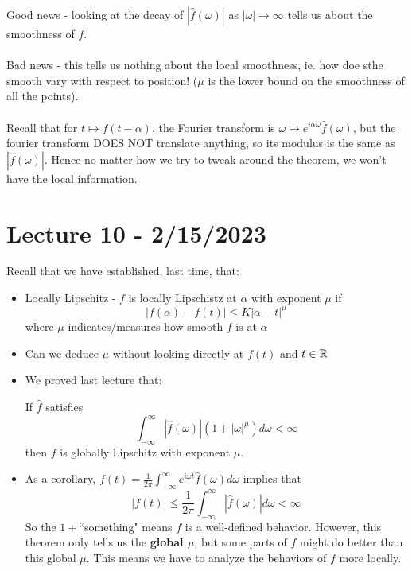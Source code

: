 \documentclass{article}
\begin{document}
Good news - looking at the decay of $|\widehat{f}(\omega)|$ as $|\omega| \to \infty$ tells us about the smoothness of $f$.\\\\

Bad news - this tells us nothing about the local smoothness, ie. how doe sthe smooth vary with respect to position! ($\mu$ is the lower bound on the smoothness of all the points).\\\\

Recall that for $t \mapsto f(t - \alpha)$, the Fourier transform is $\omega \mapsto e^{i \alpha \omega} \widehat{f}(\omega)$, but the fourier transform DOES NOT translate anything, so its modulus is the same as $|\widehat{f}(\omega)|$. Hence no matter how we try to tweak around the theorem, we won't have the local information.

\newpage
\section{Lecture 10 - 2/15/2023}

Recall that we have established, last time, that:
\begin{itemize}
    \item Locally Lipschitz - $f$ is locally Lipschistz at $\alpha$ with exponent $\mu$ if
    \[|f(\alpha) - f(t)| \leq K|\alpha - t|^\mu\]
    where $\mu$ indicates/measures how smooth $f$ is at $\alpha$
    \item Can we deduce $\mu$ without looking directly at $f(t)$ and $t \in \mathbb{R}$
    \item We proved last lecture that:
\begin{theorem}
    If $\widehat{f}$ satisfies
    \[\int_{-\infty}^\infty |\widehat{f}(\omega)| (1 + |\omega|^\mu) d\omega < \infty\]
    then $f$ is globally Lipschitz with exponent $\mu$.
\end{theorem}
    \item As a corollary, $f(t) = \frac{1}{2\pi} \int_{-\infty}^\infty e^{i\omega t} \widehat{f}(\omega) d\omega$ implies that
    \[|f(t)| \leq \frac{1}{2\pi} \int_{-\infty}^\infty |\widehat{f}(\omega)| d\omega < \infty\]
    So the $1 +$``something" means $f$ is a well-defined behavior. However, this theorem only tells us the \textbf{global $\mu$}, but some parts of $f$ might do better than this global $\mu$. This means we have to analyze the behaviors of $f$ more locally.
\end{itemize}
\end{document}
